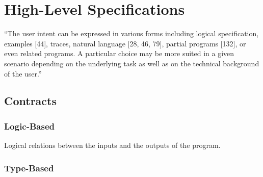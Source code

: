 \section{High-Level Specifications}
\label{sec:specifications}

``The user intent can be expressed in various forms including logical
specification, examples [44], traces, natural language [28, 46, 79], partial
programs [132], or even related programs. A particular choice may be more suited
in a given scenario depending on the underlying task as well as on the technical
background of the user.''




\subsection{Contracts}
\subsubsection{Logic-Based}
Logical relations between the inputs and the outputs of the program.
\subsubsection{Type-Based}

